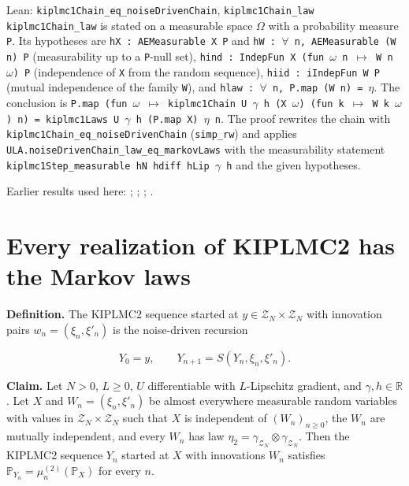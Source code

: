 \documentclass[11pt,a4paper]{article}
\begin{document}
\begin{leanbox}{Lean: \texttt{kiplmc1Chain\_\allowbreak{}eq\_\allowbreak{}noiseDrivenChain}, \texttt{kiplmc1Chain\_\allowbreak{}law}}
\texttt{kiplmc1\allowbreak{}Chain\_\allowbreak{}law} is stated on a measurable space \texttt{\ensuremath{\Omega}} with a probability measure \texttt{P}. Its hypotheses are \texttt{h\allowbreak{}X : AEMeasurable X P} and \texttt{h\allowbreak{}W : \ensuremath{\forall} n, AEMeasurable (W n) P} (measurability up to a \texttt{P}-null set), \texttt{hind : Indep\allowbreak{}Fun X (fun \ensuremath{\omega} n \ensuremath{\mapsto} W n \ensuremath{\omega}) P} (independence of \texttt{X} from the random sequence), \texttt{hiid : i\allowbreak{}Indep\allowbreak{}Fun W P} (mutual independence of the family \texttt{W}), and \texttt{hlaw : \ensuremath{\forall} n, P.\allowbreak{}map (W n) = \ensuremath{\eta}}. The conclusion is \texttt{P.\allowbreak{}map (fun \ensuremath{\omega} \ensuremath{\mapsto} kiplmc1\allowbreak{}Chain U \ensuremath{\gamma} h (X \ensuremath{\omega}) (fun k \ensuremath{\mapsto} W k \ensuremath{\omega}) n) = kiplmc1\allowbreak{}Laws U \ensuremath{\gamma} h (P.\allowbreak{}map X) \ensuremath{\eta} n}. The proof rewrites the chain with \texttt{kiplmc1\allowbreak{}Chain\_\allowbreak{}eq\_\allowbreak{}noise\allowbreak{}Driven\allowbreak{}Chain} (\texttt{simp\_\allowbreak{}rw}) and applies \texttt{ULA.\allowbreak{}noise\allowbreak{}Driven\allowbreak{}Chain\_\allowbreak{}law\_\allowbreak{}eq\_\allowbreak{}markov\allowbreak{}Laws} with the measurability statement \texttt{kiplmc1\allowbreak{}Step\_\allowbreak{}measurable h\allowbreak{}N hdiff h\allowbreak{}Lip \ensuremath{\gamma} h} and the given hypotheses.
\end{leanbox}


Earlier results used here: \cite[Section~3.20.1]{LangevinLean2026ULASC}; \cite[Section~3.20.3]{LangevinLean2026ULASC}; \cite[Section~3.33.12]{LangevinLean2026ULASC}; \cite[Section~3.1.1]{LangevinLean2026IPLA}.

\section{\texorpdfstring{Every realization of KIPLMC2 has the Markov laws}{Every realization of KIPLMC2 has the Markov laws}}


\textbf{Definition.} The KIPLMC2 sequence started at \(y\in\mathcal Z_N\times\mathcal Z_N\) with innovation pairs \(w_n=(\xi_n,\xi'_n)\) is the noise-driven recursion


\[Y_0=y,\qquad Y_{n+1}=S(Y_n,\xi_n,\xi'_n).\]


\textbf{Claim.} Let \(N>0\), \(L\ge0\), \(U\) differentiable with \(L\)-Lipschitz gradient, and \(\gamma,h\in\mathbb R\). Let \(X\) and \(W_n=(\xi_n,\xi'_n)\) be almost everywhere measurable random variables with values in \(\mathcal Z_N\times\mathcal Z_N\) such that \(X\) is independent of \((W_n)_{n\ge0}\), the \(W_n\) are mutually independent, and every \(W_n\) has law \(\eta_2=\gamma_{\mathcal Z_N}\otimes\gamma_{\mathcal Z_N}\). Then the KIPLMC2 sequence \(Y_n\) started at \(X\) with innovations \(W_n\) satisfies \(\mathbb P_{Y_n}=\mu^{(2)}_n(\mathbb P_X)\) for every \(n\).
\end{document}
